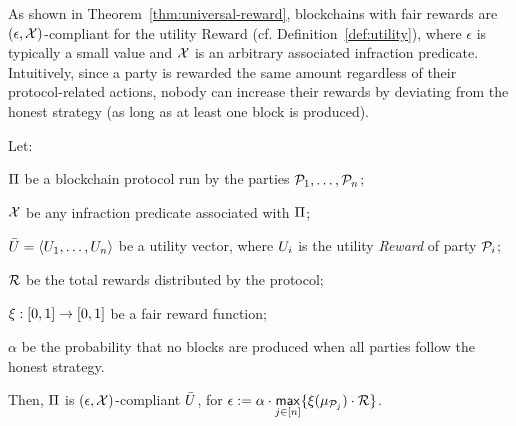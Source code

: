 As shown in Theorem~\ref{thm:universal-reward}, blockchains with fair
rewards are $(\epsilon,\mathcal{X})$-compliant for the utility Reward (cf. Definition~\ref{def:utility}), where $\epsilon$ is typically a small value and $\mathcal{X}$ is an arbitrary associated infraction predicate. Intuitively, since a
party is rewarded the same amount regardless of their protocol-related actions,
nobody can increase their rewards by deviating from the honest
strategy (as long as at least one block is produced).

\begin{theorem}\label{thm:universal-reward}
    Let:
    \begin{inparaenum}[i)]
        \item $\Pi$ be a blockchain protocol run by the parties $\mathcal{P}_1, \ldots, \mathcal{P}_n$;
        \item $\mathcal{X}$ be any infraction predicate associated with $\Pi$;
        \item $\bar{U}=\langle U_1, \ldots, U_n \rangle$ be a utility vector, where $U_i$ is the utility \emph{Reward} of party $\mathcal{P}_i$;
        \item $\mathcal{R}$ be the total rewards distributed by the protocol;
        \item $\xi: [0, 1] \rightarrow [0, 1]$ be a fair reward function;
        \item $\alpha$ be the probability that no blocks are produced when all parties follow the honest strategy.
    \end{inparaenum}
    Then, $\Pi$ is $(\epsilon, \mathcal{X})$-compliant \wrt $\bar{U}$, for $\epsilon := \alpha \cdot \underset{j \in [n]}{\mathsf{max}}\{\xi(\mu_{\mathcal{P}_j}) \cdot \mathcal{R} \}$.
\end{theorem}
